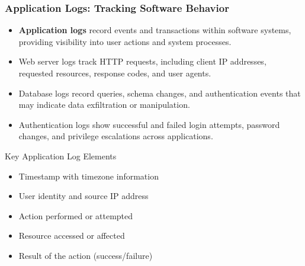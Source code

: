 \documentclass{beamer}
\begin{document}
\begin{frame}
\frametitle{Application Logs: Tracking Software Behavior}
\begin{itemize}
\item \textbf{Application logs} record events and transactions within software systems, providing visibility into user actions and system processes.
\item Web server logs track HTTP requests, including client IP addresses, requested resources, response codes, and user agents.
\item Database logs record queries, schema changes, and authentication events that may indicate data exfiltration or manipulation.
\item Authentication logs show successful and failed login attempts, password changes, and privilege escalations across applications.
\end{itemize}

\begin{block}{Key Application Log Elements}
\scriptsize
\begin{itemize}
\item Timestamp with timezone information
\item User identity and source IP address
\item Action performed or attempted
\item Resource accessed or affected
\item Result of the action (success/failure)
\end{itemize}
\end{block}
\end{frame}
\end{document}
